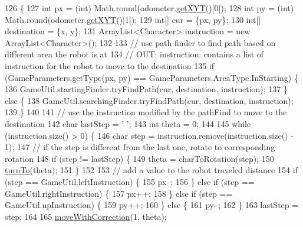 \begin{DoxyCode}
126                                                                   \{
127     \textcolor{keywordtype}{int} px = (int) Math.round(odometer.\hyperlink{classca_1_1mcgill_1_1ecse211_1_1odometer_1_1_odometer_data_a8f40f0264c68f0cbed4fff1723ae7863}{getXYT}()[0]);
128     \textcolor{keywordtype}{int} py = (int) Math.round(odometer.\hyperlink{classca_1_1mcgill_1_1ecse211_1_1odometer_1_1_odometer_data_a8f40f0264c68f0cbed4fff1723ae7863}{getXYT}()[1]);
129     \textcolor{keywordtype}{int}[] cur = \{px, py\};
130     \textcolor{keywordtype}{int}[] destination = \{x, y\};
131     ArrayList<Character> instruction = \textcolor{keyword}{new} ArrayList<Character>();
132 
133     \textcolor{comment}{// use path finder to find path based on different area the robot is at}
134     \textcolor{comment}{// OUT: instruction: contains a list of instruction for the robot to move to the destination}
135     \textcolor{keywordflow}{if} (GameParameters.getType(px, py) == GameParameters.AreaType.InStarting) \{
136       GameUtil.startingFinder.tryFindPath(cur, destination, instruction);
137     \} \textcolor{keywordflow}{else} \{
138       GameUtil.searchingFinder.tryFindPath(cur, destination, instruction);
139     \}
140 
141     \textcolor{comment}{// use the instruction modified by the pathFind to move to the destination}
142     \textcolor{keywordtype}{char} lastStep = \textcolor{charliteral}{' '};
143     \textcolor{keywordtype}{int} theta = 0;
144 
145     \textcolor{keywordflow}{while} (instruction.size() > 0) \{
146       \textcolor{keywordtype}{char} step = instruction.remove(instruction.size() - 1);
147       \textcolor{comment}{// if the step is different from the last one, rotate to corresponding rotation}
148       \textcolor{keywordflow}{if} (step != lastStep) \{
149         theta = charToRotation(step);
150         \hyperlink{classca_1_1mcgill_1_1ecse211_1_1project_1_1_navigation_a3bbe0645f2b3b3d0986b4a707fb5a00c}{turnTo}(theta);
151       \}
152 
153       \textcolor{comment}{// add a value to the robot traveled distance}
154       \textcolor{keywordflow}{if} (step == GameUtil.leftInstruction) \{
155         px--;
156       \} \textcolor{keywordflow}{else} \textcolor{keywordflow}{if} (step == GameUtil.rightInstruction) \{
157         px++;
158       \} \textcolor{keywordflow}{else} \textcolor{keywordflow}{if} (step == GameUtil.upInstruction) \{
159         py++;
160       \} \textcolor{keywordflow}{else} \{
161         py--;
162       \}
163       lastStep = step;
164 
165       \hyperlink{classca_1_1mcgill_1_1ecse211_1_1project_1_1_navigation_a48eeb9ae2da23664421e8da5642054c7}{moveWithCorrection}(1, theta);

\end{DoxyCode}

